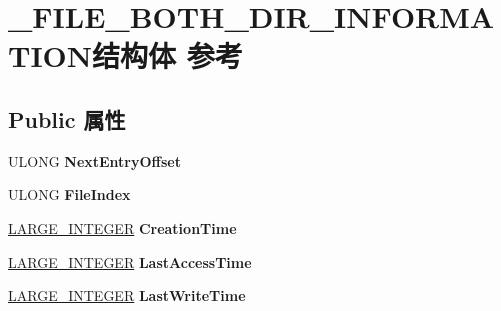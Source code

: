 \hypertarget{struct___f_i_l_e___b_o_t_h___d_i_r___i_n_f_o_r_m_a_t_i_o_n}{}\section{\+\_\+\+F\+I\+L\+E\+\_\+\+B\+O\+T\+H\+\_\+\+D\+I\+R\+\_\+\+I\+N\+F\+O\+R\+M\+A\+T\+I\+O\+N结构体 参考}
\label{struct___f_i_l_e___b_o_t_h___d_i_r___i_n_f_o_r_m_a_t_i_o_n}
\subsection*{Public 属性}
\begin{DoxyCompactItemize}
\item 
\mbox{\label{struct___f_i_l_e___b_o_t_h___d_i_r___i_n_f_o_r_m_a_t_i_o_n_aa5c1fc768f4ef8745bcca89c542a1d3a}} 
U\+L\+O\+NG {\bfseries Next\+Entry\+Offset}
\item 
\mbox{\label{struct___f_i_l_e___b_o_t_h___d_i_r___i_n_f_o_r_m_a_t_i_o_n_a7086e2a905303e69ec6520231c038be1}} 
U\+L\+O\+NG {\bfseries File\+Index}
\item 
\mbox{\label{struct___f_i_l_e___b_o_t_h___d_i_r___i_n_f_o_r_m_a_t_i_o_n_a0d954026fdb6a812e26bf5534cb2caf6}} 
\hyperlink{union___l_a_r_g_e___i_n_t_e_g_e_r}{L\+A\+R\+G\+E\+\_\+\+I\+N\+T\+E\+G\+ER} {\bfseries Creation\+Time}
\item 
\mbox{\label{struct___f_i_l_e___b_o_t_h___d_i_r___i_n_f_o_r_m_a_t_i_o_n_ab39f52a38ad68f44932289f8ec2a9896}} 
\hyperlink{union___l_a_r_g_e___i_n_t_e_g_e_r}{L\+A\+R\+G\+E\+\_\+\+I\+N\+T\+E\+G\+ER} {\bfseries Last\+Access\+Time}
\item 
\mbox{\label{struct___f_i_l_e___b_o_t_h___d_i_r___i_n_f_o_r_m_a_t_i_o_n_ae2097fdbb6cd1a56a18cf2d9ba37800c}} 
\hyperlink{union___l_a_r_g_e___i_n_t_e_g_e_r}{L\+A\+R\+G\+E\+\_\+\+I\+N\+T\+E\+G\+ER} {\bfseries Last\+Write\+Time}
\item 

\end{DoxyCompactItemize}
